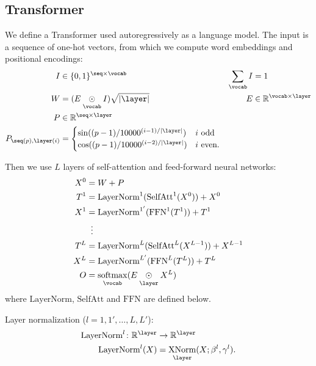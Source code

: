 \documentclass{article}
\newcommand{\reals}{\mathbb{R}}
\begin{document}
\subsection{Transformer}
\label{sec:transformer}

We define a Transformer used autoregressively as a language model.
The input is a sequence of one-hot vectors, from which we compute word embeddings and positional encodings:
\begin{align*}
  I &\in \{0, 1\}^{\seq \times \vocab} & \nsum{\vocab} I &= 1 \\
  W &= (E \ndot{\vocab} I)\sqrt{|\layer|} & E &\in \reals^{\vocab \times \layer} \\
  P &\in \reals^{\seq \times \layer} \\
  P_{\seq(p), \layer(i)} &= \begin{cases}
    \sin((p-1) / 10000^{(i-1) / |\layer|}) & \text{$i$ odd} \\ 
    \cos((p-1) / 10000^{(i-2) / |\layer|}) & \text{$i$ even.}
  \end{cases}
\end{align*}

Then we use $L$ layers of self-attention and feed-forward neural networks:
\begin{align*} 
X^0 &= W+P \\
T^1 &= \text{LayerNorm}^1(\text{SelfAtt}^1(X^0)) + X^0\\
X^1 &= \text{LayerNorm}^{1'}(\text{FFN}^1(T^1)) + T^1\\
&\vdotswithin{=} \\
T^{L} &= \text{LayerNorm}^L(\text{SelfAtt}^L(X^{L-1})) + X^{L-1}\\
X^{L} &= \text{LayerNorm}^{L'}(\text{FFN}^L(T^L)) + T^L\\
O &= \nfun{\vocab}{softmax}(E \ndot{\layer} X^L)
\end{align*}
where $\text{LayerNorm}$, $\text{SelfAtt}$ and $\text{FFN}$ are defined below.

Layer normalization ($l = 1, 1', \ldots, L, L'$):
\begin{align*}
  \text{LayerNorm}^l \colon \mathbb{R}^{\layer} &\rightarrow \mathbb{R}^{\layer} \\
  \text{LayerNorm}^l(X) &= \nfun{\layer}{XNorm}(X; \beta^l, \gamma^l).
\end{align*}
\end{document}

